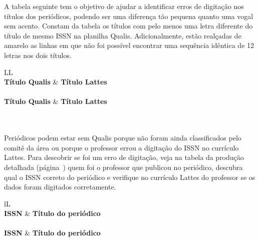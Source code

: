 \documentclass[12pt,brazil]{article}\usepackage[]{graphicx}\usepackage[]{xcolor}
\newcounter{tabela}
\begin{document}
\clearpage

A tabela seguinte tem o objetivo de ajudar a identificar erros de
digitação nos títulos dos periódicos, podendo ser uma diferença tão pequena
quanto uma vogal sem acento. Constam da tabela os títulos com pelo menos uma
letra diferente do título de mesmo ISSN na planilha Qualis. Adicionalmente,
estão realçadas de amarelo as linhas em que não foi possível encontrar uma
sequência idêntica de 12 letras nos dois títulos.

\label{ tab:ttldif }
\begin{ltabulary}{LL}
 \\
  \toprule
\textbf{Título Qualis} & \textbf{Título Lattes} \\
\midrule
\endfirsthead
{} \\
  \toprule
\textbf{Título Qualis} & \textbf{Título Lattes} \\
\midrule
\endhead
\midrule
{} \\
\endfoot
\bottomrule
\endlastfoot
 \\
\end{ltabulary}


\clearpage

Periódicos podem estar sem Qualis porque não foram ainda classificados pelo
comitê da área ou porque o professor errou a digitação do ISSN no currículo
Lattes. Para descobrir se foi um erro de digitação, veja na
tabela da produção detalhada (página~\pageref{tab:proddet}) quem foi o professor que publicou no periódico,
descubra qual o ISSN correto do periódico e verifique no currículo Lattes do
professor se os dados foram digitados corretamente.

\begin{ltabulary}{lL}
 \\
  \toprule
\textbf{ISSN} & \textbf{Título do periódico} \\
\midrule
\endfirsthead
{} \\
  \toprule
\textbf{ISSN} & \textbf{Título do periódico} \\
\midrule
\endhead
\midrule
{} \\
\endfoot
\bottomrule
\endlastfoot
 \\
\end{ltabulary}
\end{document}
